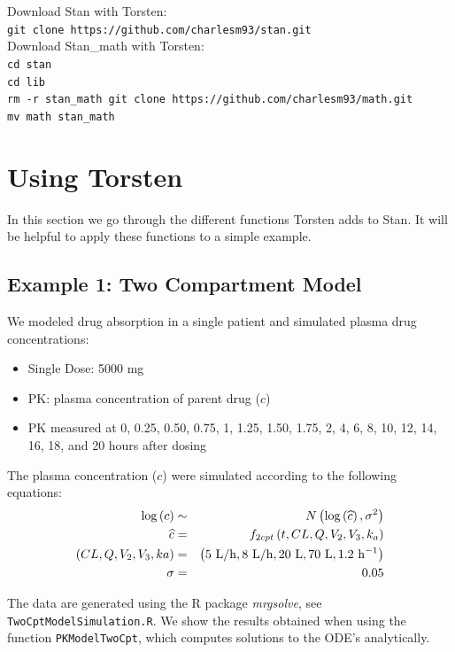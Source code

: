 \documentclass[11pt]{amsart}
\let\oldsection\section
\renewcommand\section{\clearpage\oldsection}
\begin{document}
Download Stan with Torsten: \\
\texttt{git clone https://github.com/charlesm93/stan.git} \\

Download Stan\_math with Torsten: \\
\texttt{cd stan \\
cd lib \\
rm -r stan\_math
git clone https://github.com/charlesm93/math.git \\
mv math stan\_math} \\

\section{Using Torsten}

In this section we go through the different functions Torsten adds to Stan. It will be helpful to apply these functions to a simple example.

\subsection*{Example 1: Two Compartment Model}
We modeled drug absorption in a single patient and simulated plasma drug concentrations:
\begin{itemize}
  \item Single Dose: 5000 mg
  \item PK: plasma concentration of parent drug ($c$)
  \item PK measured at 0, 0.25, 0.50, 0.75, 1, 1.25, 1.50, 1.75, 2, 4, 6, 8, 10, 12, 14, 16, 18, and 20 hours after dosing
\end{itemize}

The plasma concentration ($c$) were simulated according to the following equations:
\begin{eqnarray*}
\log\left(c\right) &\sim& N\left(\log\left(\widehat{c}\right),\sigma^2\right) \\
 \widehat{c} &=& f_{2cpt}\left(t, CL, Q, V_2, V_3, k_a\right) \\
  \left(CL, Q, V_2, V_3, ka\right) &=& 
	\left(5\ {\rm L/h}, 8\  {\rm L/h}, 20\  {\rm L},  70\ {\rm L}, 1.2\ {\rm h^{-1}} \right) \\
  \sigma &=& 0.05
\end{eqnarray*}

The data are generated using the R package \textit{mrgsolve}, see \texttt{TwoCptModelSimulation.R}. We show the results obtained when using the function \texttt{PKModelTwoCpt}, which computes solutions to the ODE's analytically.
\end{document}
